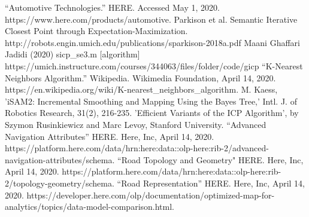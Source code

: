 \documentclass[letterpaper, 10 pt, conference]{ieeeconf}  %
\begin{document}
\begin{thebibliography}{99}

 “Automotive Technologies.” HERE. Accessed May 1, 2020. https://www.here.com/products/automotive.
 Parkison et al. Semantic Iterative Closest Point through Expectation-Maximization. http://robots.engin.umich.edu/publications/sparkison-2018a.pdf
 Maani Ghaffari Jadidi (2020) sicp\_se3.m [algorithm] https://umich.instructure.com/courses/344063/files/folder/code/gicp
 “K-Nearest Neighbors Algorithm.” Wikipedia. Wikimedia Foundation, April 14, 2020. https://en.wikipedia.org/wiki/K-nearest\_neighbors\_algorithm.
 M. Kaess, 'iSAM2: Incremental Smoothing and Mapping Using the Bayes Tree,' Intl. J. of Robotics Research, 31(2), 216-235.
'Efficient Variants of the ICP Algorithm', by Szymon Rusinkiewicz and Marc Levoy, Stanford University.
 “Advanced Navigation Attributes” HERE. Here, Inc, April 14, 2020.  https://platform.here.com/data/hrn:here:data::olp-here:rib-2/advanced-navigation-attributes/schema.
 “Road Topology and Geometry" HERE. Here, Inc, April 14, 2020.  https://platform.here.com/data/hrn:here:data::olp-here:rib-2/topology-geometry/schema.
 “Road Representation” HERE. Here, Inc, April 14, 2020.  https://developer.here.com/olp/documentation/optimized-map-for-analytics/topics/data-model-comparison.html.


\end{thebibliography}
\end{document}
